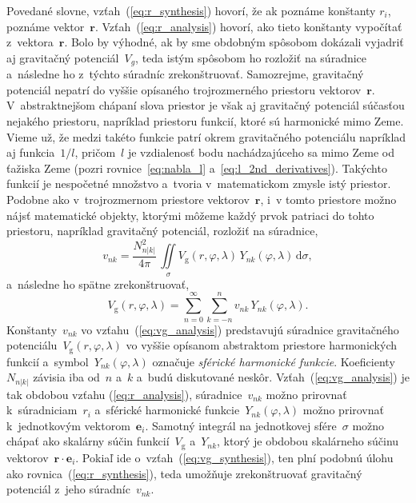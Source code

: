 \documentclass[a4paper,12pt]{book}
\newcommand{\diff}{\mathrm d}
\newcommand{\gidx}{\mathrm g}
\let\vec\mathbf
\begin{document}
Povedané slovne, vzťah~(\ref{eq:r_synthesis}) hovorí, že ak poznáme konštanty 
$r_i$, poznáme vektor~$\vec r$.  Vzťah~(\ref{eq:r_analysis}) hovorí, ako tieto 
konštanty vypočítať z~vektora~$\vec r$.  Bolo by výhodné, ak by sme obdobným 
spôsobom dokázali vyjadriť aj gravitačný potenciál~$V_g$, teda istým spôsobom 
ho rozložiť na súradnice a~následne ho z~týchto súradníc zrekonštruovať.  
Samozrejme, gravitačný potenciál nepatrí do vyššie opísaného trojrozmerného 
priestoru vektorov~$\vec r$.  V~abstraktnejšom chápaní slova priestor je však 
aj gravitačný potenciál súčasťou nejakého priestoru, napríklad priestoru 
funkcií, ktoré sú harmonické mimo Zeme.  Vieme už, že medzi takéto funkcie 
patrí okrem gravitačného potenciálu napríklad aj funkcia~$1 \slash l$, 
pričom~$l$ je vzdialenosť bodu nachádzajúceho sa mimo Zeme od ťažiska Zeme 
(pozri rovnice~\ref{eq:nabla_l} a~\ref{eq:l_2nd_derivatives}).  Takýchto 
funkcií je nespočetné množstvo a~tvoria v~matematickom zmysle istý priestor.  
Podobne ako v~trojrozmernom priestore vektorov~$\vec r$, i~v tomto priestore 
možno nájsť matematické objekty, ktorými môžeme každý prvok patriaci do tohto 
priestoru, napríklad gravitačný potenciál, rozložiť na súradnice,
%
\begin{equation}
\label{eq:vg_analysis}
v_{nk} = \frac{N^2_{n|k|}}{4\pi} \, \iint\limits_{\sigma} V_\gidx(r, \varphi, 
\lambda) \, Y_{nk}(\varphi, \lambda) \, \diff \sigma{,}
\end{equation}
%
a~následne ho spätne zrekonštruovať,
%
\begin{equation}
\label{eq:vg_synthesis}
V_\gidx(r, \varphi, \lambda) = \sum_{n = 0}^{\infty} \sum_{k = -n}^{n} v_{nk}
\, Y_{nk}(\varphi, \lambda){.}
\end{equation}
%
Konštanty~$v_{nk}$ vo vzťahu~(\ref{eq:vg_analysis}) predstavujú súradnice
gravitačného potenciálu~$V_\gidx(r, \varphi, \lambda)$ vo vyššie opísanom
abstraktom priestore harmonických funkcií a~symbol~$Y_{nk}(\varphi, \lambda)$
označuje \emph{sférické harmonické funkcie}.  Koeficienty~$N_{n|k|}$ závisia
iba od~$n$ a~$k$ a~budú diskutované neskôr.  Vzťah~(\ref{eq:vg_analysis}) je
tak obdobou vzťahu (\ref{eq:r_analysis}), súradnice~$v_{nk}$ možno prirovnať
k~súradniciam~$r_i$ a~sférické harmonické funkcie~$Y_{nk}(\varphi, \lambda)$
možno prirovnať k~jednotkovým vektorom~$\vec e_i$.  Samotný integrál na
jednotkovej sfére~$\sigma$ možno chápať ako skalárny súčin funkcií~$V_\gidx$
a~$Y_{nk}$, ktorý je obdobou skalárneho súčinu vektorov~$\vec r \cdot \vec
e_i$.  Pokiaľ ide o~vzťah~(\ref{eq:vg_synthesis}), ten plní podobnú úlohu ako
rovnica~(\ref{eq:r_synthesis}), teda umožňuje zrekonštruovať gravitačný
potenciál z~jeho súradníc~$v_{nk}$.
\end{document}
